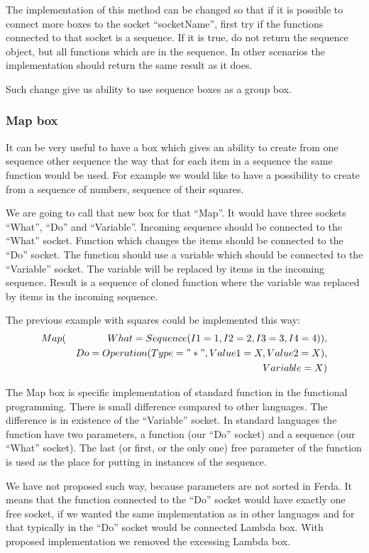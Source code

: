 \documentclass[a4paper,12pt]{book}
\begin{document}
The implementation of this method can be changed so that if it is possible to connect more boxes to the socket ``socketName'', first try if the functions connected to that socket is a sequence. If it is true, do not return the sequence object, but all functions which are in the sequence. In other scenarios the implementation should return the same result as it does.

Such change give us ability to use sequence boxes as a group box.

\subsubsection{Map box}
It can be very useful to have a box which gives an ability to create from one sequence other sequence the way that for each item in a sequence the same function would be used. For example we would like to have a possibility to create from a sequence of numbers, sequence of their squares. 

We are going to call that new box for that ``Map''. It would have three sockets ``What'', ``Do'' and ``Variable''. Incoming sequence should be connected to the ``What'' socket. Function which changes the items should be connected to the ``Do'' socket. The function should use a variable which should be connected to the ``Variable'' socket. The variable will be replaced by items in the incoming sequence. Result is a sequence of cloned function where the variable was replaced by items in the incoming sequence.

The previous example with squares could be implemented this way:
\begin{eqnarray*}
Map(&&What=Sequence(I1=1,I2=2,I3=3,I4=4)), \\&& Do=Operation(Type="*", Value1=X, Value2=X), \\&& Variable=X)
\end{eqnarray*}

The Map box is specific implementation of standard function in the functional programming. There is small difference compared to other languages. The difference is in existence of the ``Variable'' socket. In standard languages the function have two parameters, a function (our ``Do'' socket) and a sequence (our ``What'' socket). The last (or first, or the only one) free parameter of the function is used as the place for putting in instances of the sequence.

We have not proposed such way, because parameters are not sorted in Ferda. It means that the function connected to the ``Do'' socket would have exactly one free socket, if we wanted the same implementation as in other languages and for that typically in the ``Do'' socket would be connected Lambda box. With proposed implementation we removed the excessing Lambda box.
\end{document}
